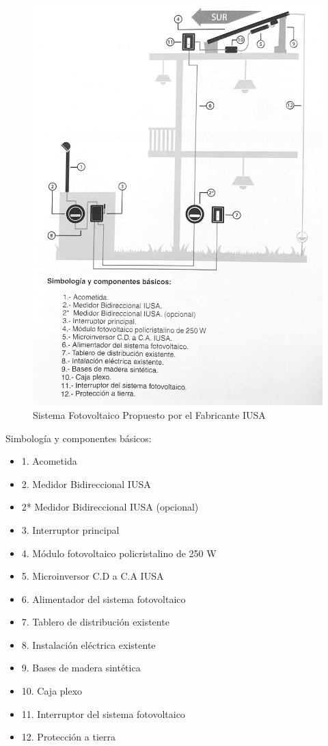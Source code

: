 \begin{figure}[H]
	\centering
	\includegraphics[scale=.1]{Capitulo2/images/sistema-fotovoltaico.jpg}
	\caption{Sistema Fotovoltaico Propuesto por el Fabricante IUSA}
	\label{fig:sistema fotovoltaicoa IUSA}
\end{figure}

Simbología y componentes básicos:
\begin{itemize}
	\item 1. Acometida
	\item 2. Medidor Bidireccional IUSA
	\item 2* Medidor Bidireccional IUSA (opcional)
	\item 3. Interruptor principal
	\item 4. Módulo fotovoltaico policristalino de 250 W
	\item 5. Microinversor C.D a C.A IUSA
	\item 6. Alimentador del sistema fotovoltaico
	\item 7. Tablero de distribución existente
	\item 8. Instalación eléctrica existente
	\item 9. Bases de madera sintética
	\item 10. Caja plexo
	\item 11. Interruptor del sistema fotovoltaico
	\item 12. Protección a tierra
\end{itemize}

